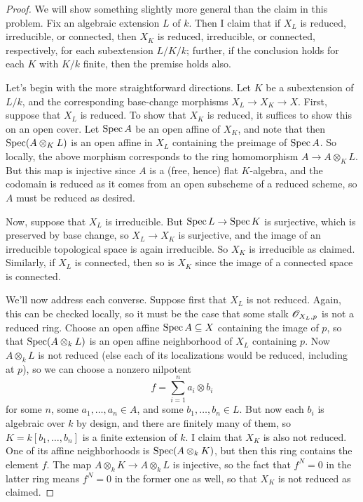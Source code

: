 \begin{proof}
	We will show something slightly more general than the claim in this problem. Fix an algebraic extension $L$ of $k$. Then I claim that if $X_L$ is reduced, irreducible, or connected, then $X_K$ is reduced, irreducible, or connected, respectively, for each subextension $L/K/k$; further, if the conclusion holds for each $K$ with $K/k$ finite, then the premise holds also.
	
	Let's begin with the more straightforward directions. Let $K$ be a subextension of $L/k$, and the corresponding base-change morphisms $X_L \to X_K \to X$. First, suppose that $X_L$ is reduced. To show that $X_K$ is reduced, it suffices to show this on an open cover. Let $\operatorname{Spec} A$ be an open affine of $X_K$, and note that then $\operatorname{Spec}(A \otimes_K L)$ is an open affine in $X_L$ containing the preimage of $\operatorname{Spec} A$. So locally, the above morphism corresponds to the ring homomorphism $A \to A \otimes_K L$. But this map is injective since $A$ is a (free, hence) flat $K$-algebra, and the codomain is reduced as it comes from an open subscheme of a reduced scheme, so $A$ must be reduced as desired.
	
	Now, suppose that $X_L$ is irreducible. But $\operatorname{Spec} L \to \operatorname{Spec} K$ is surjective, which is preserved by base change, so $X_L \to X_K$ is surjective, and the image of an irreducible topological space is again irreducible. So $X_K$ is irreducible as claimed. Similarly, if $X_L$ is connected, then so is $X_K$ since the image of a connected space is connected.
	
	We'll now address each converse. Suppose first that $X_L$ is not reduced. Again, this can be checked locally, so it must be the case that some stalk $\mathscr{O}_{X_L,p}$ is not a reduced ring. Choose an open affine $\operatorname{Spec} A \subseteq X$ containing the image of $p$, so that $\operatorname{Spec}(A \otimes_k L)$ is an open affine neighborhood of $X_L$ containing $p$. Now $A \otimes_k L$ is not reduced (else each of its localizations would be reduced, including at $p$), so we can choose a nonzero nilpotent
	\[ f = \sum_{i=1}^n a_i \otimes b_i \]
	for some $n$, some $a_1,\ldots,a_n \in A$, and some $b_1,\ldots,b_n \in L$. But now each $b_i$ is algebraic over $k$ by design, and there are finitely many of them, so $K = k[b_1,\ldots,b_n]$ is a finite extension of $k$. I claim that $X_K$ is also not reduced. One of its affine neighborhoods is $\operatorname{Spec}(A \otimes_k K)$, but then this ring contains the element $f$. The map $A \otimes_k K \to A \otimes_k L$ is injective, so the fact that $f^N = 0$ in the latter ring means $f^N=0$ in the former one as well, so that $X_K$ is not reduced as claimed.
	

\end{proof}
